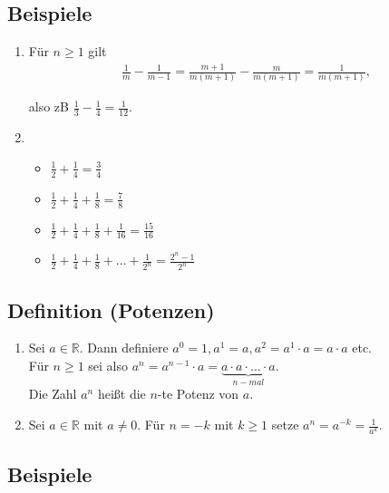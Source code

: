 \subsection{Beispiele}

	 \begin{enumerate}
	 
	 \item Für $n \geq 1$ gilt
	 \begin{align*}
	 	\frac{1}{m} - \frac{1}{m-1} = \frac{m+1}{m(m+1)}-\frac{m}{m(m+1)} = \frac{1}{m(m+1)},
	 \end{align*}
	  
	  also zB $\frac{1}{3}-\frac{1}{4}=\frac{1}{12}$.
	  
	  \item \begin{itemize}
	  		\item $\frac{1}{2}+\frac{1}{4}=\frac{3}{4}$
	  		\item $\frac{1}{2}+\frac{1}{4}+\frac{1}{8}=\frac{7}{8}$
	  		\item $\frac{1}{2} +\frac{1}{4}+\frac{1}{8}+\frac{1}{16}=\frac{15}{16}$
	  		\item $\frac{1}{2} +\frac{1}{4}+\frac{1}{8}+\dots+\frac{1}{2^n}=\frac{2^n-1}{2^n}$
	  		\end{itemize}
	 
	 \end{enumerate}
	 
	 
\subsection[Potenzen]{Definition (Potenzen)}

	\begin{enumerate}
	\item Sei $a \in \mathbb{R}$. Dann definiere $a^0=1, a^1=a, a^2=a^1\cdot a = a\cdot a$ etc.\\
	Für $n\geq 1$ sei also $a^n= a^{n-1}\cdot a = \underbrace{a \cdot a \cdot \ldots \cdot a}_{n-mal}$.\\
	Die Zahl $a^n$ heißt die $n$-te Potenz von $a$.
	
	\item Sei $a \in \mathbb{R}$ mit $a \neq 0$. Für $n=-k$ mit $k\geq 1$ setze $a^n = a^{-k}= \frac{1}{a^k}$.\\
	
	\end{enumerate}


\subsection{Beispiele}
	
